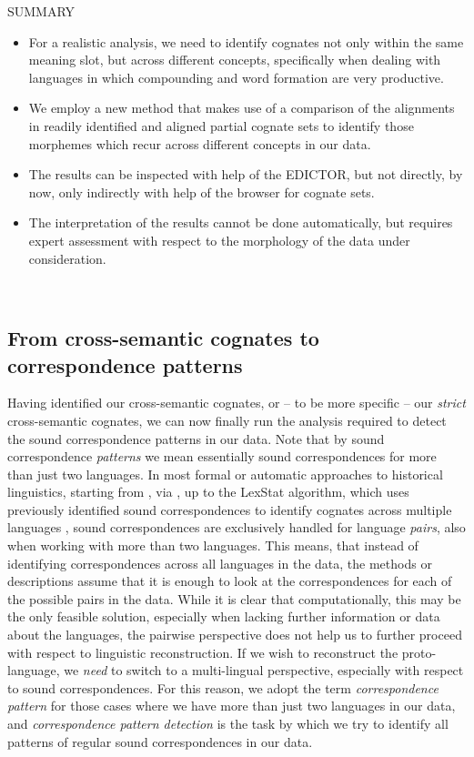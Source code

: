 \documentclass[xetex,svgnames]{scrartcl}
\begin{document}
\begin{center}
  \hline
  SUMMARY \\\hline
  \begin{itemize}
    \item For a realistic analysis, we need to identify cognates not only within the same meaning
      slot, but across different concepts, specifically when dealing with languages in which
      compounding and word formation are very productive.
    \item We employ a new method that makes use of a comparison of the alignments in readily
      identified and aligned partial cognate sets to identify those morphemes which recur across
      different concepts in our data.
    \item The results can be inspected with help of the EDICTOR, but not directly, by now, only
      indirectly with help of the browser for cognate sets.
    \item The interpretation of the results cannot be done automatically, but requires expert
      assessment with respect to the morphology of the data under consideration.
  \end{itemize}\\\hline
  \endtabular
\end{center}


\subsection{From cross-semantic cognates to correspondence patterns}
Having identified our cross-semantic cognates, or -- to be more specific -- our \emph{strict}
cross-semantic cognates, we can now finally run the analysis required to detect the sound
correspondence patterns in our data. Note that by sound correspondence \emph{patterns} we mean
essentially sound correspondences for more than just two languages. In most formal or automatic
approaches to historical linguistics, starting from \citet{Hoenigswald1960}, via
\citep{Kondrak2003}, up to the LexStat algorithm, which uses previously identified sound
correspondences to identify cognates across multiple languages \citep{List2012b}, sound
correspondences are exclusively handled for language \emph{pairs}, also when working with more than
two languages. This means, that instead of identifying correspondences across all languages in the
data, the methods or descriptions assume that it is enough to look at the correspondences for each
of the possible pairs in the data. While it is clear that computationally, this may be the only
feasible solution, especially when lacking further information or data about the languages, the
pairwise perspective does not help us to further proceed with respect to linguistic reconstruction.
If we wish to reconstruct the proto-language, we \emph{need} to switch to a multi-lingual
perspective, especially with respect to sound correspondences. For this reason, we adopt the term
\emph{correspondence pattern} for those cases where we have more than just two languages in our
data, and \emph{correspondence pattern detection} is the task by which we try to identify all
patterns of regular sound correspondences in our data.
\end{document}
